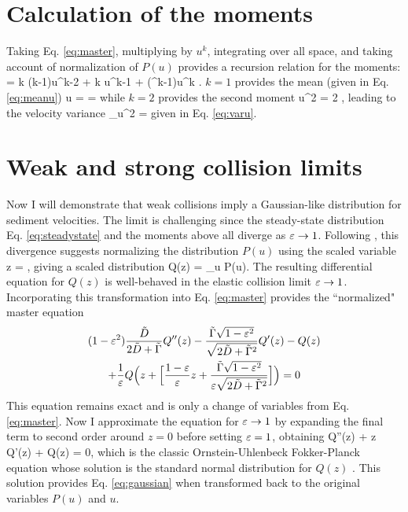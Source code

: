 \section{Calculation of the moments}
\label{sec:langmoments}
Taking Eq. \ref{eq:master}, multiplying by $u^k$, integrating over all space, and taking account of normalization of $P(u)$ provides a recursion relation for the moments: 
 =  k (k-1)\langle u^{k-2} \rangle + \tilde{\Gamma} k \langle u^{k-1} \rangle + (\ve^k-1)\langle u^k \rangle. \ee
$k=1$ provides the mean (given in Eq. \ref{eq:meanu})
\be \langle u \rangle =   =  \ee
while $k=2$ provides the second moment
\be \langle u^2 \rangle = 2 , \ee
leading to the velocity variance
\be \sigma_u^2 = \ee
given in Eq. \ref{eq:varu}.
\section{Weak and strong collision limits}
\label{sec:langextremes}
Now I will demonstrate that weak collisions imply a Gaussian-like distribution for sediment velocities. The limit is challenging since the steady-state distribution Eq. \ref{eq:steadystate} and the moments above all diverge as $\varepsilon \rightarrow 1$.
Following \cite{Hall1989}, this divergence suggests normalizing the distribution $P(u)$ using the scaled variable
\be z = , \ee
giving a scaled distribution
\be Q(z) = \sigma_u P(u).\ee
The resulting differential equation for $Q(z)$ is well-behaved in the elastic collision limit $\varepsilon \rightarrow 1$.
Incorporating this transformation into Eq. \ref{eq:master} provides the ``normalized" master equation
\begin{multline}(1-\varepsilon^2) \frac{\tilde{D}}{2\tilde{D} + \tilde{\Gamma}} Q''(z) - \frac{\tilde{\Gamma}\sqrt{1-\varepsilon^2}}{\sqrt{2\tilde{D}+\tilde{\Gamma}^2}}Q'(z) - Q(z) \\+ \frac{1}{\varepsilon} Q\Big(z + \Big[\frac{1-\varepsilon}{\varepsilon}z + \frac{\tilde{\Gamma}\sqrt{1-\varepsilon^2}}{\varepsilon\sqrt{2\tilde{D}+\tilde{\Gamma}^2}} \Big]\Big) = 0 \end{multline}
This equation remains exact and is only a change of variables from Eq. \ref{eq:master}.
Now I approximate the equation for $\varepsilon \rightarrow 1$ by expanding the final term to second order around $z=0$ before setting $\varepsilon = 1$, obtaining
\be Q''(z) + z Q'(z) + Q(z) = 0, \ee
which is the classic Ornstein-Uhlenbeck Fokker-Planck equation whose solution is the standard normal distribution for $Q(z)$ \citep[e.g.][]{Gardiner1983}.
This solution provides Eq. \ref{eq:gaussian} when transformed back to the original variables $P(u)$ and $u$.

